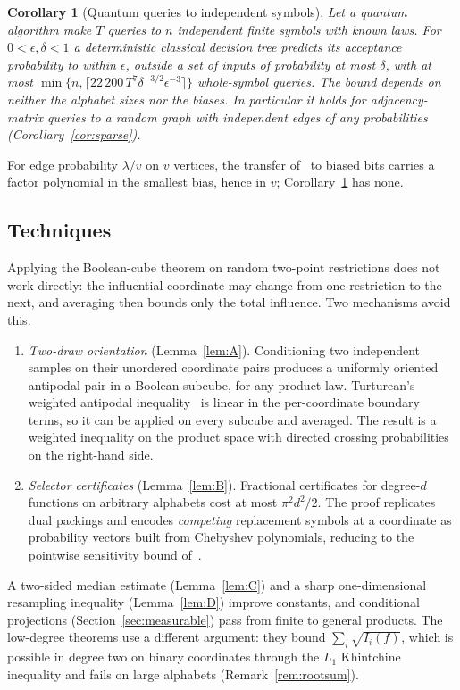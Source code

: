 \documentclass[11pt]{article}
\numberwithin{equation}{section}
\theoremstyle{plain}
\newtheorem{corollary}[theorem]{Corollary}
\theoremstyle{remark}
\begin{document}
\begin{corollary}[Quantum queries to independent symbols]\label{cor:intro}
Let a quantum algorithm make $T$ queries to $n$ independent finite symbols with known laws. For $0<\epsilon,\delta<1$ a deterministic classical decision tree predicts its acceptance probability to within $\epsilon$, outside a set of inputs of probability at most $\delta$, with at most $\min\{n,\lceil22\,200\,T^7\delta^{-3/2}\epsilon^{-3}\rceil\}$ whole-symbol queries. The bound depends on neither the alphabet sizes nor the biases. In particular it holds for adjacency-matrix queries to a random graph with independent edges of any probabilities (Corollary~\ref{cor:sparse}).
\end{corollary}

For edge probability $\lambda/v$ on $v$ vertices, the transfer of~\cite{GMNR26} to biased bits carries a factor polynomial in the smallest bias, hence in $v$; Corollary~\ref{cor:intro} has none.

\subsection{Techniques}
Applying the Boolean-cube theorem on random two-point restrictions does not work directly: the influential coordinate may change from one restriction to the next, and averaging then bounds only the total influence. Two mechanisms avoid this.
\begin{enumerate}[leftmargin=*,itemsep=1pt]
\item \emph{Two-draw orientation} (Lemma~\ref{lem:A}). Conditioning two independent samples on their unordered coordinate pairs produces a uniformly oriented antipodal pair in a Boolean subcube, for any product law. Turturean's weighted antipodal inequality~\cite[Theorem~4.3]{Tur26} is linear in the per-coordinate boundary terms, so it can be applied on every subcube and averaged. The result is a weighted inequality on the product space with directed crossing probabilities on the right-hand side.
\item \emph{Selector certificates} (Lemma~\ref{lem:B}). Fractional certificates for degree-$d$ functions on arbitrary alphabets cost at most $\pi^2d^2/2$. The proof replicates dual packings and encodes \emph{competing} replacement symbols at a coordinate as probability vectors built from Chebyshev polynomials, reducing to the pointwise sensitivity bound of~\cite{FHKL16}.
\end{enumerate}
A two-sided median estimate (Lemma~\ref{lem:C}) and a sharp one-dimensional resampling inequality (Lemma~\ref{lem:D}) improve constants, and conditional projections (Section~\ref{sec:measurable}) pass from finite to general products. The low-degree theorems use a different argument: they bound $\sum_i\sqrt{I_i(f)}$, which is possible in degree two on binary coordinates through the $L_1$ Khintchine inequality and fails on large alphabets (Remark~\ref{rem:rootsum}).
\end{document}

